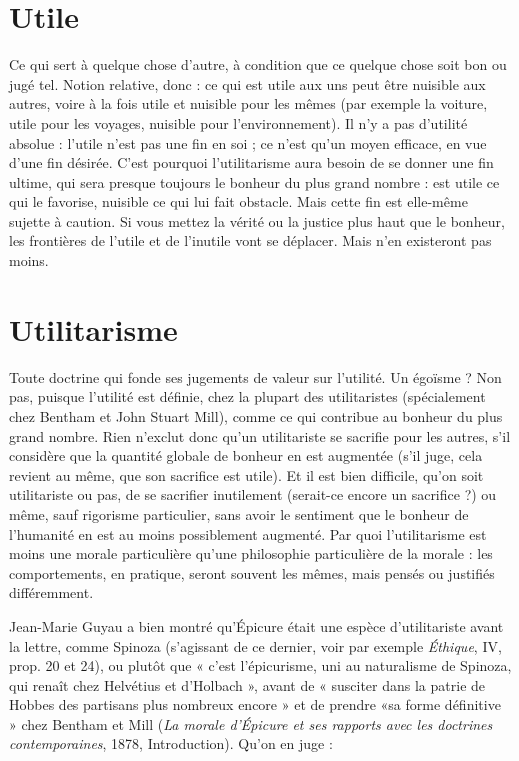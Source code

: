 \section{Utile}
Ce qui sert à quelque chose d’autre, à condition que ce quelque
chose soit bon ou jugé tel. Notion relative, donc : ce qui est utile
aux uns peut être nuisible aux autres, voire à la fois utile et nuisible pour les
mêmes (par exemple la voiture, utile pour les voyages, nuisible pour l’environnement).
Il n’y a pas d’utilité absolue : l’utile n’est pas une fin en soi ; ce n’est
qu'un moyen efficace, en vue d’une fin désirée. C’est pourquoi l’utilitarisme
aura besoin de se donner une fin ultime, qui sera presque toujours le bonheur
du plus grand nombre : est utile ce qui le favorise, nuisible ce qui lui fait obstacle.
Mais cette fin est elle-même sujette à caution. Si vous mettez la vérité ou
la justice plus haut que le bonheur, les frontières de l’utile et de l’inutile vont
se déplacer. Mais n’en existeront pas moins.

\section{Utilitarisme}
Toute doctrine qui fonde ses jugements de valeur sur l’utilité.
Un égoïsme ? Non pas, puisque l’utilité est définie,
chez la plupart des utilitaristes (spécialement chez Bentham et John Stuart
Mill), comme ce qui contribue au bonheur du plus grand nombre. Rien
n'exclut donc qu’un utilitariste se sacrifie pour les autres, s’il considère que la
quantité globale de bonheur en est augmentée (s’il juge, cela revient au même,
que son sacrifice est utile). Et il est bien difficile, qu’on soit utilitariste ou pas,
de se sacrifier inutilement (serait-ce encore un sacrifice ?) ou même, sauf rigorisme
particulier, sans avoir le sentiment que le bonheur de l'humanité en est
au moins possiblement augmenté. Par quoi l’utilitarisme est moins une morale
particulière qu’une philosophie particulière de la morale : les comportements,
en pratique, seront souvent les mêmes, mais pensés ou justifiés différemment.

Jean-Marie Guyau a bien montré qu’Épicure était une espèce d’utilitariste
avant la lettre, comme Spinoza (s'agissant de ce dernier, voir par exemple
{\it Éthique}, IV, prop. 20 et 24), ou plutôt que « c’est l’épicurisme, uni au naturalisme
de Spinoza, qui renaît chez Helvétius et d’Holbach », avant de « susciter
dans la patrie de Hobbes des partisans plus nombreux encore » et de prendre
«sa forme définitive » chez Bentham et Mill ({\it La morale d'Épicure et ses rapports
avec les doctrines contemporaines}, 1878, Introduction). Qu’on en juge :

